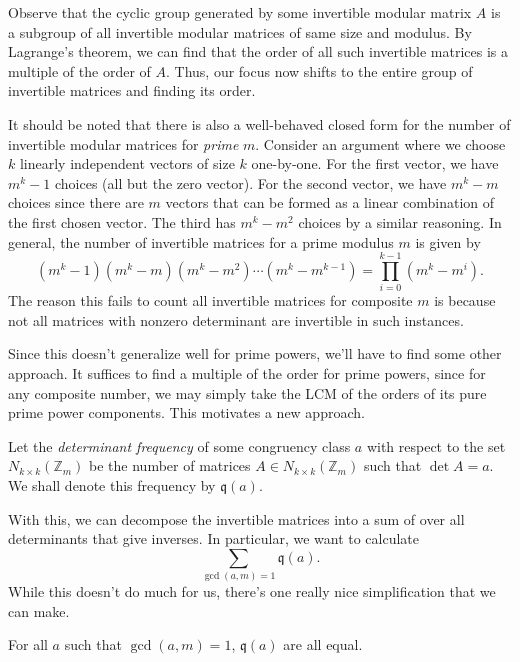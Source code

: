 \documentclass[a4paper, 12pt]{article}
\begin{document}
Observe that the cyclic group generated by some invertible modular matrix \( A \) is a subgroup of all invertible modular matrices of same size and modulus. By Lagrange's theorem, we can find that the order of all such invertible matrices is a multiple of the order of \( A \). Thus, our focus now shifts to the entire group of invertible matrices and finding its order.

\begin{remark}
    It should be noted that there is also a well-behaved closed form for the number of invertible modular matrices for \textit{prime} \( m \). Consider an argument where we choose \( k \) linearly independent vectors of size \( k \) one-by-one. For the first vector, we have \( m^k - 1 \) choices (all but the zero vector). For the second vector, we have \( m^k - m \) choices since there are \( m \) vectors that can be formed as a linear combination of the first chosen vector. The third has \( m^k - m^2 \) choices by a similar reasoning. In general, the number of invertible matrices for a prime modulus \( m \) is given by
    \[
        (m^k - 1)(m^k - m)(m^k - m^2) \cdots (m^k - m^{k - 1}) = \prod_{i = 0}^{k - 1} (m^k - m^i)
    .\]
    The reason this fails to count all invertible matrices for composite \( m \) is because not all matrices with nonzero determinant are invertible in such instances.
\end{remark}

Since this doesn't generalize well for prime powers, we'll have to find some other approach. It suffices to find a multiple of the order for prime powers, since for any composite number, we may simply take the LCM of the orders of its pure prime power components. This motivates a new approach.

\begin{definition}
    Let the \textit{determinant frequency} of some congruency class \( a \) with respect to the set \( N_{k \times k}(\mathbb{Z}_m) \) be the number of matrices \( A \in N_{k \times k}(\mathbb{Z}_m) \) such that \( \det A = a \). We shall denote this frequency by \( \mathfrak{q} (a) \).
\end{definition}

With this, we can decompose the invertible matrices into a sum of over all determinants that give inverses. In particular, we want to calculate
\[
    \sum_{\gcd(a, m) = 1} \mathfrak{q} (a)
.\]
While this doesn't do much for us, there's one really nice simplification that we can make.
\begin{theorem}
    For all \( a \) such that \( \gcd(a, m) = 1 \), \( \mathfrak{q}(a) \) are all equal.
\end{theorem}
\end{document}
